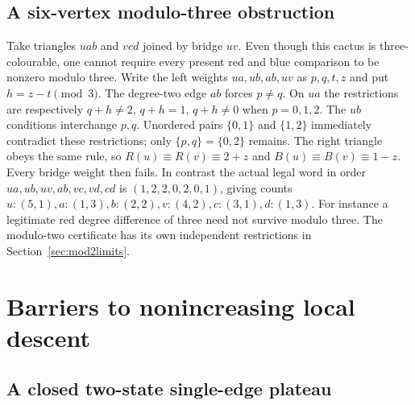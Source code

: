 \subsection{A six-vertex modulo-three obstruction}

Take triangles $uab$ and $vcd$ joined by bridge $uv$. Even though
this cactus is three-colourable, one cannot require every present
red and blue comparison to be nonzero modulo three. Write the left
weights $ua,ub,ab,uv$ as $p,q,t,z$ and put $h=z-t\pmod3$.
The degree-two edge $ab$ forces $p\ne q$. On $ua$ the restrictions
are respectively $q+h\ne2$, $q+h=1$, $q+h\ne0$ when
$p=0,1,2$. The $ub$ conditions interchange $p,q$. Unordered pairs
$\{0,1\}$ and $\{1,2\}$ immediately contradict these restrictions;
only $\{p,q\}=\{0,2\}$ remains. The right triangle obeys the
same rule, so $R(u)\equiv R(v)\equiv2+z$ and
$B(u)\equiv B(v)\equiv1-z$. Every bridge weight then fails.
In contrast the actual legal word in order
$ua,ub,uv,ab,vc,vd,cd$ is $(1,2,2,0,2,0,1)$, giving counts
$u:(5,1),a:(1,3),b:(2,2),v:(4,2),c:(3,1),d:(1,3)$.
For instance a legitimate red degree difference of three need not
survive modulo three. The modulo-two certificate has its own
independent restrictions in Section~\ref{sec:mod2limits}.

\section{Barriers to nonincreasing local descent}\label{sec:descent}

\subsection{A closed two-state single-edge plateau}

